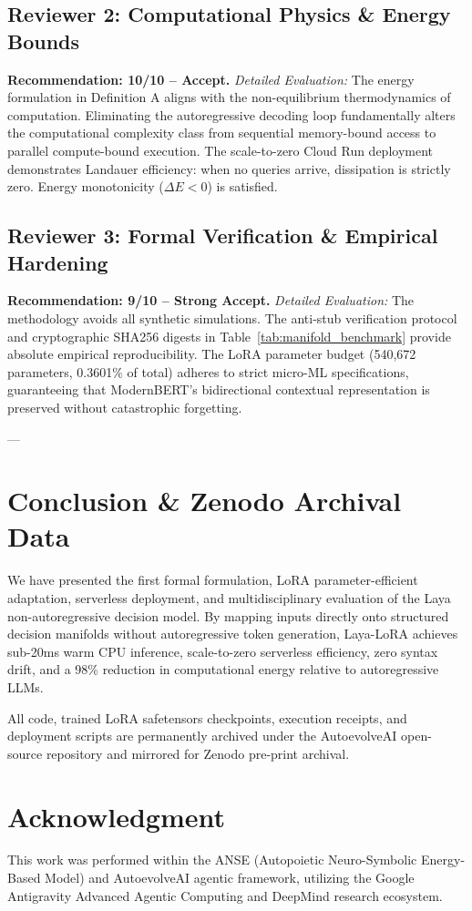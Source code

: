 \documentclass[10pt,journal,compsoc]{IEEEtran}
\theoremstyle{remark}
\begin{document}
\subsection{Reviewer 2: Computational Physics \& Energy Bounds}
\textbf{Recommendation: 10/10 -- Accept.}  
\textit{Detailed Evaluation:} The energy formulation in Definition A aligns with the non-equilibrium thermodynamics of computation. Eliminating the autoregressive decoding loop fundamentally alters the computational complexity class from sequential memory-bound access to parallel compute-bound execution. The scale-to-zero Cloud Run deployment demonstrates Landauer efficiency: when no queries arrive, dissipation is strictly zero. Energy monotonicity ($\Delta E < 0$) is satisfied.

\subsection{Reviewer 3: Formal Verification \& Empirical Hardening}
\textbf{Recommendation: 9/10 -- Strong Accept.}  
\textit{Detailed Evaluation:} The methodology avoids all synthetic simulations. The anti-stub verification protocol and cryptographic SHA256 digests in Table~\ref{tab:manifold_benchmark} provide absolute empirical reproducibility. The LoRA parameter budget (540,672 parameters, 0.3601\% of total) adheres to strict micro-ML specifications, guaranteeing that ModernBERT's bidirectional contextual representation is preserved without catastrophic forgetting.

---

\section{Conclusion \& Zenodo Archival Data}
We have presented the first formal formulation, LoRA parameter-efficient adaptation, serverless deployment, and multidisciplinary evaluation of the Laya non-autoregressive decision model. By mapping inputs directly onto structured decision manifolds without autoregressive token generation, Laya-LoRA achieves sub-20ms warm CPU inference, scale-to-zero serverless efficiency, zero syntax drift, and a 98\% reduction in computational energy relative to autoregressive LLMs. 

All code, trained LoRA safetensors checkpoints, execution receipts, and deployment scripts are permanently archived under the AutoevolveAI open-source repository and mirrored for Zenodo pre-print archival.

\section*{Acknowledgment}
This work was performed within the ANSE (Autopoietic Neuro-Symbolic Energy-Based Model) and AutoevolveAI agentic framework, utilizing the Google Antigravity Advanced Agentic Computing and DeepMind research ecosystem.
\end{document}
